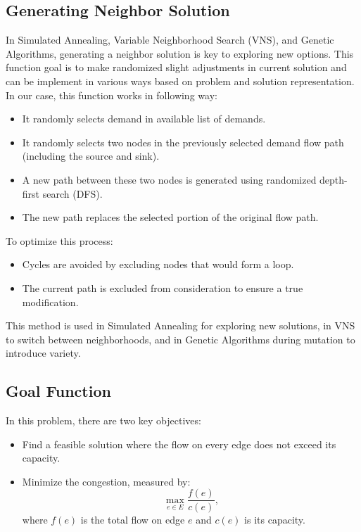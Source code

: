 \documentclass[a4paper,12pt]{article}
\begin{document}
\subsection{Generating Neighbor Solution}

In Simulated Annealing, Variable Neighborhood Search (VNS), and Genetic Algorithms, generating a neighbor solution is key to exploring new options. This function goal is to make randomized slight adjustments in current solution and can be implement in various ways based on problem and solution representation. In our case, this function works in following way:

\begin{itemize}
    \item It randomly selects demand in available list of demands.
    \item It randomly selects two nodes in the previously selected demand flow path (including the source and sink).
    \item A new path between these two nodes is generated using randomized depth-first search (DFS).
    \item The new path replaces the selected portion of the original flow path.
\end{itemize}

To optimize this process:
\begin{itemize}
    \item Cycles are avoided by excluding nodes that would form a loop.
    \item The current path is excluded from consideration to ensure a true modification.
\end{itemize}

This method is used in Simulated Annealing for exploring new solutions, in VNS to switch between neighborhoods, and in Genetic Algorithms during mutation to introduce variety.

\subsection{Goal Function}

In this problem, there are two key objectives:
\begin{itemize}
    \item Find a feasible solution where the flow on every edge does not exceed its capacity.
    \item Minimize the congestion, measured by: 
    \[
    \max_{e \in E} \frac{f(e)}{c(e)},
    \]
    where \( f(e) \) is the total flow on edge \( e \) and \( c(e) \) is its capacity.
\end{itemize}
\end{document}
